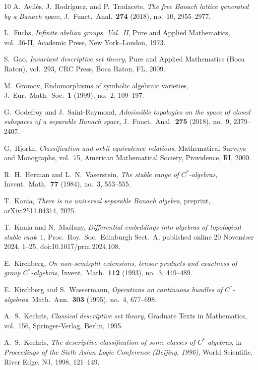 \documentclass[12pt,fleqn,a4paper]{amsart}
\numberwithin{equation}{section}
\theoremstyle{definition}
\begin{document}
\begin{thebibliography}{10}
A.~Avil{\'e}s, J.~Rodr{\'i}guez, and P.~Tradacete,
\emph{The free Banach lattice generated by a Banach space},
J.\ Funct.\ Anal.\ \textbf{274} (2018), no.~10, 2955--2977.

L.~Fuchs,
\emph{Infinite abelian groups. Vol.~II},
Pure and Applied Mathematics, vol.~36-II,
Academic Press, New York--London, 1973.

S.~Gao,
\emph{Invariant descriptive set theory},
Pure and Applied Mathematics (Boca Raton), vol.~293,
CRC Press, Boca Raton, FL, 2009.

M.~Gromov,
Endomorphisms of symbolic algebraic varieties,
J.\ Eur.\ Math.\ Soc.\ \textbf{1} (1999), no.~2, 109--197.

G.~Godefroy and J.~Saint-Raymond,
\emph{Admissible topologies on the space of closed subspaces of a separable Banach space},
J.\ Funct.\ Anal.\ \textbf{275} (2018), no.~9, 2379--2407.


G.~Hjorth,
\emph{Classification and orbit equivalence relations},
Mathematical Surveys and Monographs, vol.~75,
American Mathematical Society, Providence, RI, 2000.

R.~H.~Herman and L.~N.~Vaserstein,
\emph{The stable range of $C^*$-algebras},
Invent.\ Math.\ \textbf{77} (1984), no.~3, 553--555.

T.~Kania,
\emph{There is no universal separable Banach algebra},
preprint, arXiv:2511.04314, 2025.

T.~Kania and N.~Ma{\'s}lany,
\emph{Differential embeddings into algebras of topological stable rank~$1$},
Proc.\ Roy.\ Soc.\ Edinburgh Sect.~A, published online 20 November 2024,
1--25, doi:10.1017/prm.2024.108.

E.~Kirchberg,
\emph{On non-semisplit extensions, tensor products and exactness of group $C^*$-algebras},
Invent.\ Math.\ \textbf{112} (1993), no.~3, 449--489.

E.~Kirchberg and S.~Wassermann,
\emph{Operations on continuous bundles of $C^*$-algebras},
Math.\ Ann.\ \textbf{303} (1995), no.~4, 677--698.

A.~S.~Kechris,
\emph{Classical descriptive set theory},
Graduate Texts in Mathematics, vol.~156,
Springer-Verlag, Berlin, 1995.

A.~S.~Kechris,
\emph{The descriptive classification of some classes of $C^*$-algebras},
in \emph{Proceedings of the Sixth Asian Logic Conference (Beijing, 1996)},
World Scientific, River Edge, NJ, 1998, 121--149.


\end{thebibliography}
\end{document}
